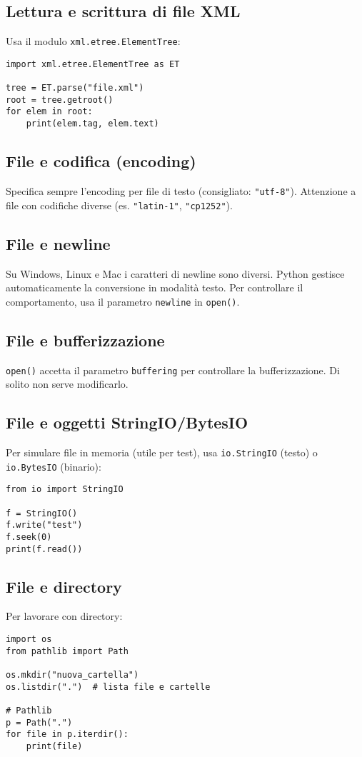 \documentclass[a4paper,12pt]{article}
\begin{document}
\subsection*{Lettura e scrittura di file XML}
Usa il modulo \texttt{xml.etree.ElementTree}:
\begin{lstlisting}
import xml.etree.ElementTree as ET

tree = ET.parse("file.xml")
root = tree.getroot()
for elem in root:
    print(elem.tag, elem.text)
\end{lstlisting}

\subsection*{File e codifica (encoding)}
Specifica sempre l'encoding per file di testo (consigliato: \texttt{"utf-8"}). Attenzione a file con codifiche diverse (es. \texttt{"latin-1"}, \texttt{"cp1252"}).

\subsection*{File e newline}
Su Windows, Linux e Mac i caratteri di newline sono diversi. Python gestisce automaticamente la conversione in modalità testo. Per controllare il comportamento, usa il parametro \texttt{newline} in \texttt{open()}.

\subsection*{File e bufferizzazione}
\texttt{open()} accetta il parametro \texttt{buffering} per controllare la bufferizzazione. Di solito non serve modificarlo.

\subsection*{File e oggetti StringIO/BytesIO}
Per simulare file in memoria (utile per test), usa \texttt{io.StringIO} (testo) o \texttt{io.BytesIO} (binario):
\begin{lstlisting}
from io import StringIO

f = StringIO()
f.write("test")
f.seek(0)
print(f.read())
\end{lstlisting}

\subsection*{File e directory}
Per lavorare con directory:
\begin{lstlisting}
import os
from pathlib import Path

os.mkdir("nuova_cartella")
os.listdir(".")  # lista file e cartelle

# Pathlib
p = Path(".")
for file in p.iterdir():
    print(file)
\end{lstlisting}
\end{document}
